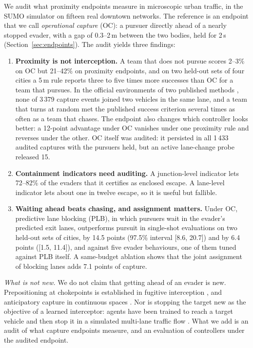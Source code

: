 \documentclass[5p,twocolumn]{elsarticle}
\begin{document}
We audit what proximity endpoints measure in microscopic urban traffic, in the SUMO simulator \cite{lopez2018sumo} on
fifteen real downtown networks. The reference is an endpoint that we call \emph{operational capture} (OC): a pursuer
directly ahead of a nearly stopped evader, with a gap of 0.3--2\,m between the two bodies, held for 2\,s
(Section~\ref{sec:endpoints}). The audit yields three findings:
\begin{enumerate}
\item \textbf{Proximity is not interception.} A team that does not pursue scores 2--3\% on OC but 21--42\% on
proximity endpoints, and on two held-out sets of four cities a 5\,m rule reports three to five times more successes
than OC for a team that pursues. In the official environments of two published methods
\cite{li2023dgmarl,li2024pepcrl}, none of 3\,379 capture events joined two vehicles in the same lane, and a team that
turns at random met the published success criterion several times as often as a team that chases. The endpoint also
changes which controller looks better: a 12-point advantage under OC vanishes under one proximity rule and reverses
under the other. OC itself was audited: it persisted in all 1\,433 audited captures with the pursuers held, but an
active lane-change probe released 15.
\item \textbf{Containment indicators need auditing.} A junction-level indicator lets 72--82\% of the evaders that it
certifies as enclosed escape. A lane-level indicator lets about one in twelve escape, so it is useful but fallible.
\item \textbf{Waiting ahead beats chasing, and assignment matters.} Under OC, predictive lane blocking (PLB), in which
pursuers wait in the evader's predicted exit lanes, outperforms pursuit in single-shot evaluations on two held-out
sets of cities, by 14.5 points (97.5\% interval [8.6, 20.7]) and by 6.4 points ([1.5, 11.4]), and against five evader
behaviours, one of them tuned against PLB itself. A same-budget ablation shows that the joint assignment of blocking
lanes adds 7.1 points of capture.
\end{enumerate}

\emph{What is not new.} We do not claim that getting ahead of an evader is new. Prepositioning at chokepoints is
established in fugitive interception \cite{vandroffelaar2024simopt,vandroffelaar2025graph}, and anticipatory capture in
continuous spaces \cite{chen2026ambush}. Nor is stopping the target new as the objective of a learned interceptor:
agents have been trained to reach a target vehicle and then stop it in a simulated multi-lane traffic flow
\cite{bykov2025interceptor}. What we add is an audit of what capture endpoints measure, and an evaluation of
controllers under the audited endpoint.
\end{document}
